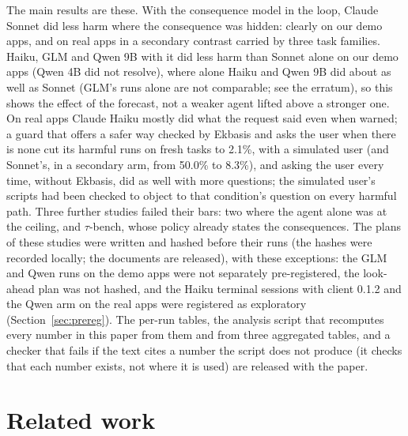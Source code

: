 \documentclass[11pt]{article}
\begin{document}
The main results are these. With the consequence model in the loop, Claude Sonnet did less harm where the consequence was
hidden: clearly on our demo apps, and on real apps in a secondary contrast carried by three task families. Haiku, GLM
and Qwen 9B with it did less harm than Sonnet alone on our demo apps (Qwen 4B did not resolve), where alone Haiku and
Qwen 9B did about as well as Sonnet (GLM's runs alone are not comparable; see the erratum), so this shows the effect of
the forecast, not a weaker agent lifted above a stronger one. On real apps Claude Haiku mostly did what the request said even when warned; a guard that offers a safer
way checked by Ekbasis and asks the user when there is none cut its harmful runs on fresh tasks to 2.1\%, with a
simulated user (and Sonnet's, in a secondary arm, from 50.0\% to 8.3\%), and asking the user every time, without Ekbasis, did as well with more questions; the simulated user's
scripts had been checked to object to that condition's question on every harmful path. Three further studies failed their bars: two where the agent alone was at the ceiling, and $\tau$-bench, whose
policy already states the consequences. The plans of these
studies were written and hashed before their runs (the hashes were recorded locally; the documents are released), with
these exceptions: the GLM and Qwen runs on the demo apps were not separately pre-registered, the look-ahead plan was not
hashed, and the Haiku terminal sessions with client 0.1.2 and the Qwen arm on the real apps were registered as
exploratory (Section~\ref{sec:prereg}). The per-run tables, the analysis script that recomputes every number in this
paper from them and from three aggregated tables, and a checker that fails if the text cites a number the script does
not produce (it checks that each number exists, not where it is used) are released with the paper.

\section{Related work}\label{sec:related}
\end{document}

